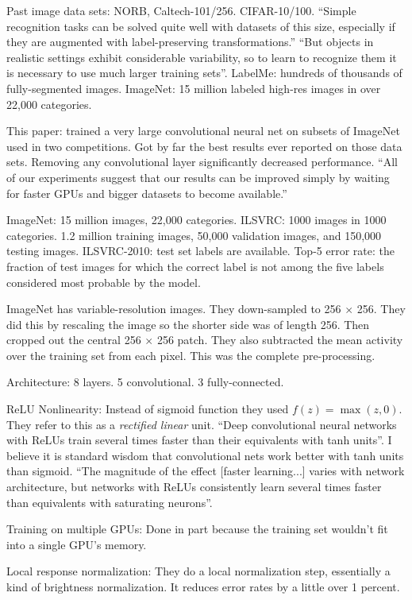 \documentclass[12pt]{article}
\begin{document}
Past image data sets: NORB, Caltech-101/256. CIFAR-10/100.  ``Simple
recognition tasks can be solved quite well with datasets of this size,
especially if they are augmented with label-preserving
transformations.''  ``But objects in realistic settings exhibit
considerable variability, so to learn to recognize them it is
necessary to use much larger training sets''.  LabelMe: hundreds of
thousands of fully-segmented images.  ImageNet: 15 million labeled
high-res images in over 22,000 categories.

This paper: trained a very large convolutional neural net on subsets
of ImageNet used in two competitions.  Got by far the best results
ever reported on those data sets.  Removing any convolutional layer
significantly decreased performance.  ``All of our experiments suggest
that our results can be improved simply by waiting for faster GPUs and
bigger datasets to become available.''

ImageNet: 15 million images, 22,000 categories.  ILSVRC: 1000 images
in 1000 categories.  1.2 million training images, 50,000 validation
images, and 150,000 testing images.  ILSVRC-2010: test set labels are
available.  Top-5 error rate: the fraction of test images for which
the correct label is not among the five labels considered most
probable by the model.

ImageNet has variable-resolution images.  They down-sampled to 256
$\times$ 256.  They did this by rescaling the image so the shorter
side was of length 256.  Then cropped out the central 256 $\times$ 256
patch.  They also subtracted the mean activity over the training set
from each pixel.  This was the complete pre-processing.

Architecture: 8 layers.  5 convolutional.  3 fully-connected.

ReLU Nonlinearity: Instead of sigmoid function they used $f(z) =
\max(z, 0)$.  They refer to this as a \emph{rectified linear} unit.
``Deep convolutional neural networks with ReLUs train several times
faster than their equivalents with tanh units''.  I believe it is
standard wisdom that convolutional nets work better with tanh units
than sigmoid.  ``The magnitude of the effect [faster learning...]
varies with network architecture, but networks with ReLUs consistently
learn several times faster than equivalents with saturating neurons''.

Training on multiple GPUs: Done in part because the training set
wouldn't fit into a single GPU's memory.

Local response normalization: They do a local normalization step,
essentially a kind of brightness normalization.  It reduces error
rates by a little over 1 percent.
\end{document}
